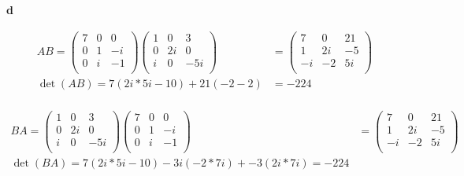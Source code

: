 \documentclass[10pt]{article} %
\begin{document}
\textbf{d}

\begin{align*}
  AB =
  \begin{pmatrix}
    7 & 0 & 0\\
    0 & 1 & -i\\
    0 & i & -1\\
  \end{pmatrix}
  \begin{pmatrix}
    1 & 0 & 3\\
    0 & 2i & 0\\
    i & 0 & -5i\\
  \end{pmatrix}
  &=
  \begin{pmatrix}
    7 & 0 & 21\\
    1 & 2i & -5\\
    -i & -2 & 5i\\
  \end{pmatrix}\\
  \det(AB) = 7\left(2i*5i - 10\right) + 21\left(-2-2\right) &= -224\\
\end{align*}

\begin{align*}
  BA =
  \begin{pmatrix}
    1 & 0 & 3\\
    0 & 2i & 0\\
    i & 0 & -5i\\
  \end{pmatrix}
  \begin{pmatrix}
    7 & 0 & 0\\
    0 & 1 & -i\\
    0 & i & -1\\
  \end{pmatrix}
  &=
  \begin{pmatrix}
    7 & 0 & 21\\
    1 & 2i & -5\\
    -i & -2 & 5i\\
  \end{pmatrix}\\
  \det(BA) = 7\left(2i*5i - 10\right) - 3i(-2*7i) + -3(2i*7i) = -224\\
\end{align*}
\end{document}
